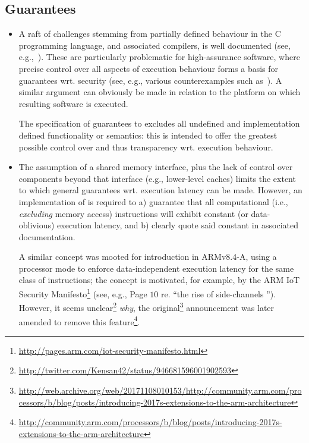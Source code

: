 
\subsection{Guarantees}
\label{sec:bg:guarantee}

\begin{itemize}

\item A raft of challenges stemming from partially defined behaviour in the
      C programming language, and associated compilers, is well documented
      (see, e.g.,~\cite[Section 2.1]{SCARV:SimChiAnd:18}).
      These are particularly problematic for high-assurance software, where
      precise control over all aspects of execution behaviour forms a basis
      for guarantees wrt. security
      (see, e.g., various counterexamples such as~\cite{SCARV:KPVV:16}).
      A similar argument can obviously be made in relation to the platform 
      on which resulting software is executed.

      The specification of \XCID guarantees to excludes all
                   undefined 
      and
      implementation defined
      functionality or semantics:
      this is intended to offer the greatest possible control over and thus
      transparency wrt. execution behaviour.

\item The assumption of a shared memory interface, plus the lack of control
      over components beyond that interface 
      (e.g., lower-level caches) 
      limits the extent to which general guarantees wrt. execution latency 
      can be made.  However, an implementation of \XCID is required to 
      a) guarantee that all computational 
         (i.e., {\em excluding} memory access) 
         instructions will exhibit constant (or data-oblivious) execution 
         latency,
         and
      b) clearly quote said constant in associated documentation.

      A similar concept was mooted for introduction in ARMv8.4-A, using a
      processor mode to enforce data-independent execution latency for the
      same class of instructions; the concept is motivated, for example,
      by the ARM IoT Security Manifesto\footnote{
      \url{http://pages.arm.com/iot-security-manifesto.html}
      } (see, e.g., Page $10$ re. ``the rise of side-channels '').
      However, it seems unclear\footnote{
      \url{http://twitter.com/Kensan42/status/946681596001902593}
      } {\em why}, the original\footnote{
      \url{http://web.archive.org/web/20171108010153/http://community.arm.com/processors/b/blog/posts/introducing-2017s-extensions-to-the-arm-architecture}
      } announcement was later amended to remove this feature\footnote{
      \url{http://community.arm.com/processors/b/blog/posts/introducing-2017s-extensions-to-the-arm-architecture}
      }.

\end{itemize}

